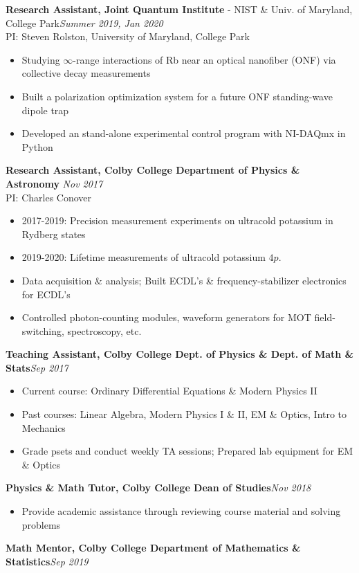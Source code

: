 \documentclass[letter, 10pt]{article}
\begin{document}
	\noindent \textbf{Research Assistant, Joint Quantum Institute} - NIST \& Univ. of Maryland, College Park\hfill \textit{Summer 2019, Jan 2020} \\ 
	\noindent PI: {Steven Rolston}, University of Maryland, College Park
	\begin{itemize}[noitemsep, nolistsep]
		\item Studying $\infty$-range interactions of Rb near an optical nanofiber (ONF) via collective decay measurements
		\item Built a polarization optimization system for a future ONF standing-wave dipole trap 
		\item Developed an stand-alone experimental control program with NI-DAQmx in Python
	\end{itemize}
	\textbf{Research Assistant, Colby College Department of Physics \& Astronomy}\hfill\textit{ Nov 2017\textemdash}\\
	PI: {Charles Conover}
	\begin{itemize}[noitemsep, nolistsep]
		\item 2017-2019: Precision measurement experiments on ultracold potassium in Rydberg states
		\item 2019-2020: Lifetime measurements of ultracold potassium $4p$. 
		\item Data acquisition \& analysis; Built ECDL's \& frequency-stabilizer electronics for ECDL's
		\item Controlled photon-counting modules, waveform generators for MOT field-switching, spectroscopy, etc.

	\end{itemize}	
 	\textbf{Teaching Assistant, Colby College Dept. of Physics \& Dept. of Math \& Stats}\hfill \textit{Sep  2017\textemdash}  
	\begin{itemize}[noitemsep, nolistsep]
		\item Current course: Ordinary Differential Equations \& Modern Physics II
		\item Past courses: Linear Algebra, Modern Physics I \& II, EM \& Optics, Intro to Mechanics
		\item Grade psets and conduct weekly TA sessions; Prepared lab equipment for EM \& Optics
	\end{itemize}
	\textbf{Physics \& Math Tutor, Colby College Dean of Studies}\hfill \textit{Nov 2018\textemdash }
	\begin{itemize}[noitemsep, nolistsep]
		\item Provide academic assistance through reviewing course material and solving problems
	\end{itemize}
	\textbf{Math Mentor, Colby College Department of Mathematics \& Statistics}\hfill \textit{Sep 2019\textemdash} \\	 
	
\end{document}
